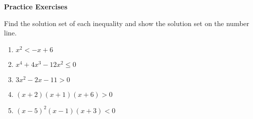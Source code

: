 \textbf{Practice Exercises}

\vspce

Find the solution set of each inequality and show the solution set on the number line. 
\begin{enumerate}[label = \arabic*. ]
\item \hspce $x^2 < -x+6 $
\item \hspce $x^4+4x^3-12x^2 \leq 0$
\item \hspce $3x^2-2x-11 > 0 $
\item \hspce $(x+2) (x+1) (x+6) >0 $
\item \hspce $(x-5)^2 (x-1) (x+3) <0 $
\end{enumerate} 